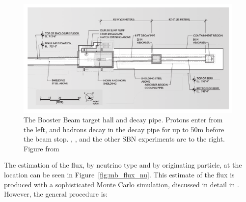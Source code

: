 \begin{figure}[tb]
  \centering
  \includegraphics[width=\textwidth]{beams_figures/mb_target_schematic}
  \caption[BNB Target Schematic]{The Booster Beam target hall and decay pipe.  Protons enter from the left, and hadrons decay in the decay pipe for up to 50m before the beam stop.  \MB, \uboone, and the other SBN experiments are to the right. Figure from \cite{AguilarArevalo:2008yp}}
  \label{fig:mb_target_schematic}
\end{figure}

The estimation of the flux, by neutrino type and by originating particle, at the \MB location can be seen in Figure~\ref{fig:mb_flux_nu}.  This estimate of the flux is produced with a sophisticated Monte Carlo simulation, discussed in detail in \cite{AguilarArevalo:2008yp}.  However, the general procedure is:

